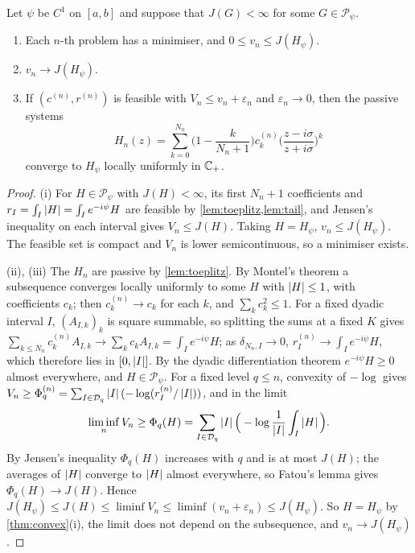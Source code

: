 \begin{theorem}\label{thm:construction}
Let $\psi$ be $C^1$ on $[a,b]$ and suppose that $J(G)<\infty$ for some
$G\in\mathcal P_\psi$.
\begin{enumerate}
\item[(i)] Each $n$-th problem has a minimiser, and $0\le v_n\le J(H_\psi)$.
\item[(ii)] $v_n\to J(H_\psi)$.
\item[(iii)] If $(c^{(n)},r^{(n)})$ is feasible with $V_n\le v_n+\varepsilon_n$
and $\varepsilon_n\to0$, then the passive systems
\[
H_n(z)=\sum_{k=0}^{N_n}\Big(1-\frac k{N_n+1}\Big)c^{(n)}_k\Big(\frac{z-i\sigma}{z+i\sigma}\Big)^k
\]
converge to $H_\psi$ locally uniformly in $\mathbb C_{+}$.
\end{enumerate}
\end{theorem}

\begin{proof}
(i) For $H\in\mathcal P_\psi$ with $J(H)<\infty$, its first $N_n+1$
coefficients and $r_I=\int_I\left|H\right|=\int_Ie^{-i\psi}H$ are feasible by
\cref{lem:toeplitz,lem:tail}, and Jensen's inequality on each interval gives
$V_n\le J(H)$. Taking $H=H_\psi$, $v_n\le J(H_\psi)$. The feasible set is compact
and $V_n$ is lower semicontinuous, so a minimiser exists.

(ii), (iii) The $H_n$ are passive by \cref{lem:toeplitz}. By Montel's theorem a
subsequence converges locally uniformly to some $H$ with $\left|H\right|\le1$, with
coefficients $c_k$; then $c^{(n)}_k\to c_k$ for each $k$, and
$\sum_kc_k^2\le1$. For a fixed dyadic interval $I$, $(A_{I,k})_k$ is square
summable, so splitting the sums at a fixed $K$ gives
$\sum_{k\le N_n}c^{(n)}_kA_{I,k}\to\sum_kc_kA_{I,k}=\int_Ie^{-i\psi}H$; as
$\delta_{N_n,I}\to0$, $r^{(n)}_I\to\int_Ie^{-i\psi}H$, which therefore lies in
$[0,\left|I\right|]$. By the dyadic differentiation theorem $e^{-i\psi}H\ge0$ almost
everywhere, and $H\in\mathcal P_\psi$. For a fixed level $q\le n$, convexity of
$-\log$ gives $V_n\ge\Phi_q^{(n)}=\sum_{I\in\mathcal D_q}\left|I\right|(-\log(r^{(n)}_I/\left|I\right|))$,
and in the limit
\[
\liminf_nV_n\ge\Phi_q(H)=\sum_{I\in\mathcal D_q}\left|I\right|\Big(-\log\frac1{\left|I\right|}\int_I\left|H\right|\Big).
\]
By Jensen's inequality $\Phi_q(H)$ increases with $q$ and is at most $J(H)$;
the averages of $\left|H\right|$ converge to $\left|H\right|$ almost everywhere, so Fatou's
lemma gives $\Phi_q(H)\to J(H)$. Hence
$J(H_\psi)\le J(H)\le\liminf V_n\le\liminf(v_n+\varepsilon_n)\le J(H_\psi)$. So
$H=H_\psi$ by \cref{thm:convex}(i), the limit does not depend on the
subsequence, and $v_n\to J(H_\psi)$.
\end{proof}

